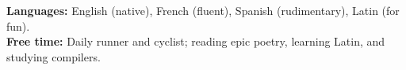 \documentclass[9pt]{developercv} %
\begin{document}


\begin{entrylist}
\end{entrylist}

{\bodyfont
\textbf{Languages:} English (native), French (fluent), Spanish (rudimentary), Latin (for fun).\\
\textbf{Free time:} Daily runner and cyclist; reading epic poetry, learning Latin, and studying compilers.\par}

\end{document}
